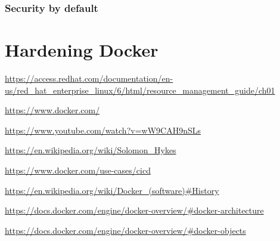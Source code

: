 \documentclass[a4paper,12pt]{article}
\begin{document}
\subsubsection{Security by default}

\newpage

\section{Hardening Docker}

\newpage

\begin{thebibliography}{99}
%
%

 
\url{https://access.redhat.com/documentation/en-us/red_hat_enterprise_linux/6/html/resource_management_guide/ch01}

\url{https://www.docker.com/}

\url{https://www.youtube.com/watch?v=wW9CAH9nSLs}

\url{https://en.wikipedia.org/wiki/Solomon_Hykes}

\url{https://www.docker.com/use-cases/cicd}

\url{https://en.wikipedia.org/wiki/Docker_(software)#History}

\url{https://docs.docker.com/engine/docker-overview/#docker-architecture}

\url{https://docs.docker.com/engine/docker-overview/#docker-objects}

\end{thebibliography}
\end{document}
